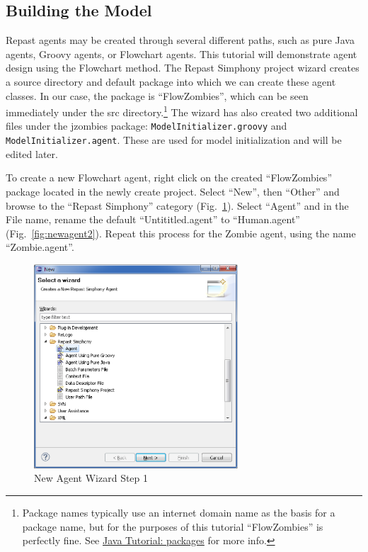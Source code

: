 \documentclass[11pt]{amsart}
\begin{document}
\subsection{Building the Model}
Repast agents may be created through several different paths, such as pure Java agents, Groovy agents, or Flowchart agents.  This tutorial will demonstrate agent design using the Flowchart method.  The Repast Simphony project wizard creates a source directory and default package into which we can create these agent classes. In our case, the package is ``FlowZombies'', which can be seen immediately under the src directory.\footnote{Package names typically use an internet domain name as the basis for a package name, but for the purposes of this tutorial ``FlowZombies'' is perfectly fine. See  \href{http://download.oracle.com/javase/tutorial/java/package/namingpkgs.html}{Java Tutorial: packages} for more info.} The wizard has also created two additional files under the jzombies package: \texttt{ModelInitializer.groovy} and \texttt{ModelInitializer.agent}. These are used for model initialization and will be edited later.

To create a new Flowchart agent, right click on the created ``FlowZombies'' package located in the newly create project.  Select ``New'', then ``Other'' and browse to the ``Repast Simphony'' category (Fig.~\ref{fig:newagent1}).  Select ``Agent'' and in the File name, rename the default ``Untititled.agent'' to ``Human.agent'' (Fig.~\ref{fig:newagent2}).  Repeat this process for the Zombie agent, using the name ``Zombie.agent''. 

\begin{figure}[h]
\begin{center}
\vspace{.2in}
\centerline {
\includegraphics[width=3in]{figs/newAgentWiz_1.eps}
}
\caption{New Agent Wizard Step 1}
\label{fig:newagent1}
\end{center}
\end{figure}
\end{document}

